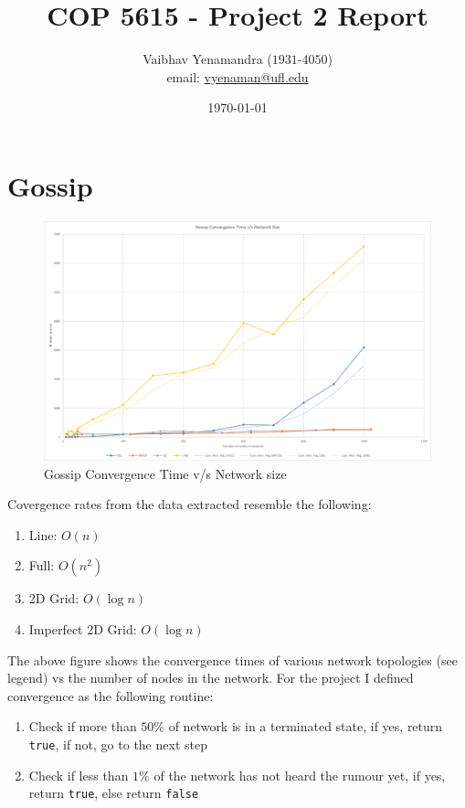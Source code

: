 \documentclass[a4paper, 10pt]{article}
\title{COP 5615 - Project 2 Report}
\author{Vaibhav Yenamandra ($1931$-$4050$)\\ email: \href{vyenaman@ufl.edu}{vyenaman@ufl.edu} }
\date{\today}
\begin{document}
    \maketitle

    \section{Gossip}

    \begin{figure}[h]
      \caption{Gossip Convergence Time v/s Network size}
      \includegraphics[width=\textwidth]{project2_gossip_chart}
    \end{figure}

    Covergence rates from the data extracted resemble the following:
    \begin{enumerate}
      \item{Line: $O(n)$}
      \item{Full: $O(n^2)$}
      \item{2D Grid: $O(\log n)$}
      \item{Imperfect 2D Grid: $O(\log n)$}
    \end{enumerate}

    The above figure shows the convergence times of various network topologies (see legend) vs the number of nodes in the network. For the project I defined convergence as the following routine:
    \begin{enumerate}
      \item{Check if more than $50\%$ of network is in a terminated state, if yes, return \texttt{true}, if not, go to the next step}
      \item{Check if less than $1\%$ of the network has not heard the rumour yet, if yes, return \texttt{true}, else return \texttt{false}}
    \end{enumerate}
\end{document}
